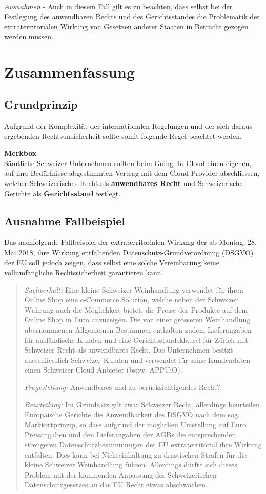 \documentclass[a4paper,pointlessnumbers]{scrreprt}
\newcommand{\merkbox}[2][0.8\textwidth]{ \begin{center} \begin{tcolorbox}[enhanced, drop fuzzy midday shadow, width={#1}, opacityframe=0.5, colframe=BrickRed, colback=white] {\ECFTeenSpirit \color{BrickRed}\textbf{Merkbox} \qquad {\tiny das gilt es zu beachten}} \\  #2 \end{tcolorbox} \end{center}}
\begin{document}
\textit{Ausnahmen} - Auch in diesem Fall gilt es zu beachten, dass selbst bei der Festlegung des anwendbaren Rechts und des Gerichtsstandes die Problematik der extraterritorialen Wirkung von Gesetzen anderer Staaten in Betracht gezogen werden müssen.

\section{Zusammenfassung}
\subsection{Grundprinzip}
Aufgrund der Komplexität der internationalen Regelungen und der sich daraus ergebenden Rechtsunsicherheit sollte somit folgende Regel beachtet werden.

\merkbox[0.7\textwidth]{Sämtliche Schweizer Unternehmen sollten beim Going To Cloud einen eigenen, auf ihre Bedürfnisse abgestimmten Vertrag mit dem Cloud Provider abschliessen, welcher Schweizerisches Recht als \textbf{anwendbares Recht} und Schweizerische Gerichte als \textbf{Gerichtsstand} festlegt.}

\subsection{Ausnahme Fallbeispiel}
Das nachfolgende Fallbeispiel der extraterritorialen Wirkung der ab Montag, 28. Mai 2018, ihre Wirkung entfaltenden Datenschutz-Grundverordnung (DSGVO) der EU soll jedoch zeigen, dass selbst eine solche Vereinbarung keine vollumfängliche Rechtssicherheit garantieren kann.

\begin{quote}
\textit{Sachverhalt:} Eine kleine Schweizer Weinhandlung verwendet für ihren Online Shop eine e-Commerce Solution, welche neben der Schweizer Währung auch die Möglichkeit bietet, die Preise der Produkte auf dem Online Shop in Euro anzuzeigen. Die von einer grösseren Weinhandlung übernommenen Allgemeinen Bestimmen enthalten zudem Lieferangaben für ausländische Kunden und eine Gerichtsstandsklausel für Zürich mit Schweizer Recht als anwendbares Recht. Das Unternehmen besitzt ausschliesslich Schweizer Kunden und verwendet für seine Kundendaten einen Schweizer Cloud Anbieter (bspw. APPUiO).

\textit{Fragestellung:} Anwendbares und zu berücksichtigendes Recht?

\textit{Beurteilung:} Im Grundsatz gilt zwar Schweizer Recht, allerdings beurteilen Europäische Gerichte die Anwendbarkeit des DSGVO nach dem sog. Marktortprinzip, so dass aufgrund der möglichen Umstellung auf Euro Preisangaben und den Lieferangaben der AGBs die entsprechenden, strengeren Datenschutzbestimmungen der EU extraterritorial ihre Wirkung entfalten. Dies kann bei Nichteinhaltung zu drastischen Strafen für die kleine Schweizer Weinhandlung führen. Allerdings dürfte sich dieses Problem mit der kommenden Anpassung des Schweizerischen Datenschutzgesetzes an das EU Recht etwas abschwächen.
\end{quote}
\end{document}
